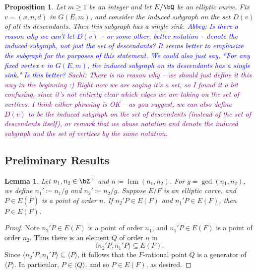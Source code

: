 \documentclass[11pt,reqno]{amsart}
\theoremstyle{plain}
\newtheorem{lemma}[theorem]{Lemma}
\newtheorem{proposition}[theorem]{Proposition}
\theoremstyle{definition}
\DeclareMathOperator{\lcm}{lcm}
\newcommand{\Q}{\bQ}
\newcommand{\Z}{\bZ}
\newcommand{\abbey}[1]{\textcolor{blue}{Abbey: #1}}
\newcommand{\sachi}[1]{\textcolor{purple}{Sachi: #1}}
\newcommand{\sedit}[1]{{\color{purple} #1}}
\begin{document}
\begin{proposition}\label{Prop:single_sink}
    Let $m\geq 1$ be an integer and let $E/\Q$ be an elliptic curve. Fix $v=(x,n,d)$ in $G(E,m)$, and consider the \sedit{induced} subgraph \sedit{on the set} $D(v)$ of all its descendants. Then \sedit{this subgraph} has a single sink. \abbey{Is there a reason why we can't let $D(v)$ -- or some other, better notation -- denote the induced subgraph, not just the set of descendants? It seems better to emphasize the subgraph for the purposes of this statement. We could also just say, ``For any fixed vertex $v$ in $G(E,m)$, the induced subgraph on its descendants has a single sink." Is this better?} \sachi{There is no reason why -- we should just define it this way in the beginning :) Right now we are saying it's a set, so I found it a bit confusing, since it's not entirely clear which edges we are taking on the set of vertices. I think either phrasing is OK -- as you suggest, we can also define $D(v)$ to be the induced subgraph on the set of descendents (instead of the set of descendents itself), or remark that we abuse notation and denote the induced subgraph and the set of vertices by the same notation.}
\end{proposition}

\subsection{Preliminary Results}

\begin{lemma}\label{lem:LCM}
Let $n_1,n_2 \in \Z^+$ and $n \coloneqq \lcm(n_1,n_2)$. For $g=\gcd(n_1,n_2)$, we define $n_1'\coloneqq n_1/g$ and $n_2'\coloneqq n_2/g$.
Suppose $E/F$ is an elliptic curve, and $P \in E(\overline{F})$ is a point of order $n$. If $n_2'P\in E(F)$ and $n_1'P \in E(F)$, then $P \in E(F)$.
\end{lemma}

\begin{proof}
Note $n_2'P \in E(F)$ is a point of order $n_1$, and $n_1'P \in E(F)$ is a point of order $n_2$.  Thus there is an element $Q$ of order $n$ in
\[
\langle n_2'P, n_1' P \rangle \subseteq E(F).
\] Since $\langle n_2'P, n_1' P \rangle \subseteq \langle P \rangle$, it follows that the $F$-rational point $Q$ is a generator of $\langle P \rangle$. In particular, $P\in \langle Q \rangle$, and so $P\in E(F)$, as desired.
\end{proof}
\end{document}
